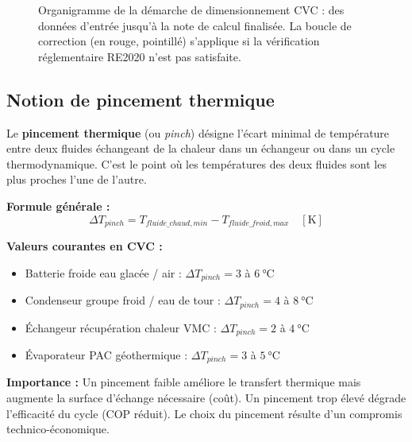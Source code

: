 \begin{figure}[H]
  \caption{Organigramme de la démarche de dimensionnement CVC : des données d'entrée
    jusqu'à la note de calcul finalisée. La boucle de correction (en rouge, pointillé)
    s'applique si la vérification réglementaire RE2020 n'est pas satisfaite.}
\end{figure}

\subsection{Notion de pincement thermique}

\begin{definition}[title={Pincement thermique (temperature pinch)}]
  Le \textbf{pincement thermique} (ou \emph{pinch}) désigne l'écart minimal de température
  entre deux fluides échangeant de la chaleur dans un échangeur ou dans un cycle thermodynamique.
  C'est le point où les températures des deux fluides sont les plus proches l'une de l'autre.

  \medskip
  \textbf{Formule générale :}
  \begin{equation}
    \Delta T_{pinch} = T_{fluide\_chaud,min} - T_{fluide\_froid,max} \quad [\si{\kelvin}]
  \end{equation}

  \textbf{Valeurs courantes en CVC :}
  \begin{itemize}
    \item Batterie froide eau glacée / air : $\Delta T_{pinch} = 3$ à $\SI{6}{\celsius}$
    \item Condenseur groupe froid / eau de tour : $\Delta T_{pinch} = 4$ à $\SI{8}{\celsius}$
    \item Échangeur récupération chaleur VMC : $\Delta T_{pinch} = 2$ à $\SI{4}{\celsius}$
    \item Évaporateur PAC géothermique : $\Delta T_{pinch} = 3$ à $\SI{5}{\celsius}$
  \end{itemize}

  \textbf{Importance :} Un pincement faible améliore le transfert thermique mais augmente
  la surface d'échange nécessaire (coût). Un pincement trop élevé dégrade l'efficacité du
  cycle (COP réduit). Le choix du pincement résulte d'un compromis technico-économique.
\end{definition}

